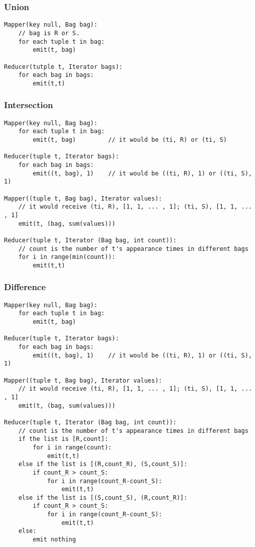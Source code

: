 \documentclass[11pt]{article}
\begin{document}
    \hypertarget{union}{%
\subsubsection{Union}\label{union}}

    \begin{verbatim}
Mapper(key null, Bag bag):
    // bag is R or S.
    for each tuple t in bag:
        emit(t, bag)

Reducer(tutple t, Iterator bags):
    for each bag in bags:
        emit(t,t)
\end{verbatim}

    \hypertarget{intersection}{%
\subsubsection{Intersection}\label{intersection}}

    \begin{verbatim}
Mapper(key null, Bag bag):
    for each tuple t in bag:
        emit(t, bag)         // it would be (ti, R) or (ti, S)

Reducer(tuple t, Iterator bags):
    for each bag in bags:
        emit((t, bag), 1)    // it would be ((ti, R), 1) or ((ti, S), 1)
        
Mapper((tuple t, Bag bag), Iterator values):
    // it would receive (ti, R), [1, 1, ... , 1]; (ti, S), [1, 1, ... , 1]
    emit(t, (bag, sum(values)))

Reducer(tuple t, Iterator (Bag bag, int count)):
    // count is the number of t's appearance times in different bags
    for i in range(min(count)):
        emit(t,t)
\end{verbatim}

    \hypertarget{difference}{%
\subsubsection{Difference}\label{difference}}

    \begin{verbatim}
Mapper(key null, Bag bag):
    for each tuple t in bag:
        emit(t, bag)
        
Reducer(tuple t, Iterator bags):
    for each bag in bags:
        emit((t, bag), 1)    // it would be ((ti, R), 1) or ((ti, S), 1)
        
Mapper((tuple t, Bag bag), Iterator values):
    // it would receive (ti, R), [1, 1, ... , 1]; (ti, S), [1, 1, ... , 1]
    emit(t, (bag, sum(values)))

Reducer(tuple t, Iterator (Bag bag, int count)):
    // count is the number of t's appearance times in different bags
    if the list is [R,count]:
        for i in range(count):
            emit(t,t)
    else if the list is [(R,count_R), (S,count_S)]:
        if count_R > count_S:
            for i in range(count_R-count_S):
                emit(t,t)
    else if the list is [(S,count_S), (R,count_R)]:
        if count_R > count_S:
            for i in range(count_R-count_S):
                emit(t,t)
    else:
        emit nothing
    
\end{verbatim}
\end{document}
